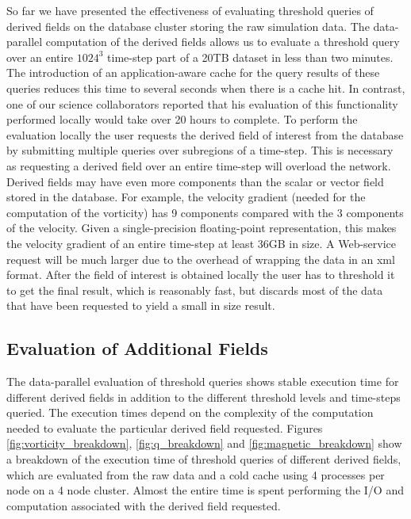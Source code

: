 \documentclass{sig-alternate}
\begin{document}
So far we have presented the effectiveness of evaluating threshold queries of derived fields on the database cluster storing the raw simulation data. The 
data-parallel computation of the derived fields allows us to evaluate a threshold query over
an entire $1024^3$ time-step part of a 20TB dataset in less than two minutes. The introduction of an application-aware cache for the query results of these
queries reduces this time to several seconds when there is a cache hit. In contrast, one of our science collaborators reported that his evaluation of this
functionality performed locally would take over 20 hours to complete. 
To perform the evaluation locally the user requests the derived field of interest from the database by submitting multiple queries over
subregions of a time-step. This is necessary as requesting a derived field over an entire time-step will overload the network. Derived fields may have even
more components than the scalar or vector field stored in the database. For example, the velocity gradient (needed for the computation of the vorticity) has 9
components compared with the 3 components of the velocity. Given a single-precision floating-point representation, this makes the velocity gradient of an
entire time-step at least 36GB in size. A Web-service request will be much larger due to the overhead of wrapping the data in an xml format. After the
field of interest is obtained locally the user has to threshold it to get the final result, which is reasonably fast, but discards most of the data that have been
requested to yield a small in size result. 

\subsection{Evaluation of Additional Fields}
The data-parallel evaluation of threshold queries shows stable execution time for different derived fields in addition to the different threshold levels and
time-steps queried. The execution times depend on the complexity of the computation needed to evaluate the particular derived field requested. Figures 
\ref{fig:vorticity_breakdown}, \ref{fig:q_breakdown} and \ref{fig:magnetic_breakdown} show a breakdown of the execution time of threshold queries of different
derived fields, which are evaluated from the raw data and a cold cache using 4 processes per node on a 4 node cluster. Almost the entire time is spent
performing the I/O and computation associated with the derived field requested. 
\end{document}

